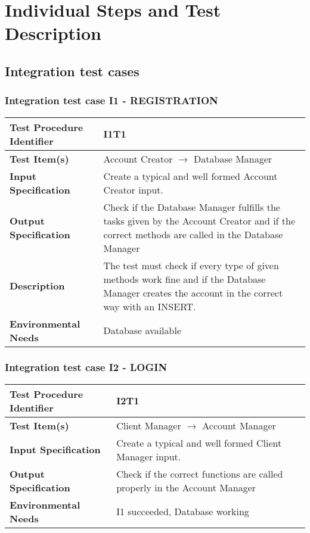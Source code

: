 \section{Individual Steps and Test Description}


\subsection{Integration test cases}
\subsubsection{Integration test case I1 - REGISTRATION} 
\hfill \newline
 \begin{tabular}{l p{}}
    \hline
    \textbf{Test Procedure Identifier} &  I1T1  \\
    \hline
    \textbf{Test Item(s)} & Account Creator  $\rightarrow$ Database Manager\\
    \hline
    \textbf{Input Specification} & Create a typical and well formed Account Creator input. \\
    \hline
    \textbf{Output Specification} & Check if the Database Manager fulfills the tasks given by the Account Creator and if the correct methods are called in the Database Manager \\
    \hline
    \textbf{Description} &   The test must check if every type of given methods work fine and if the Database Manager creates the account in the correct way with an INSERT. \\
    \hline
    \textbf{Environmental Needs} & Database available \\
    \hline
    
    \end{tabular}



\hfill \newline \newline 
\subsubsection{Integration test case I2 - LOGIN}
 \begin{tabular}{l p{}}
    \hline
    \textbf{Test Procedure Identifier} &  I2T1 \\
    \hline
    \textbf{Test Item(s)} & Client Manager  $\rightarrow$ Account Manager \\
    \hline
    \textbf{Input Specification} &  Create a typical and well formed Client Manager input.   \\
    \hline
    \textbf{Output Specification} & Check if the correct functions are called properly in the Account Manager\\
    \hline
    \textbf{Environmental Needs} & I1 succeeded, Database working \\
    \hline
\end{tabular}


